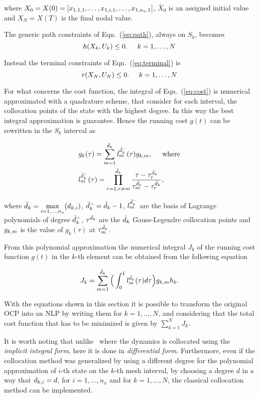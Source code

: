 where $X_0 = X(0) = [x_{1,1,1}, \dots, x_{1,i,1}, \dots, x_{1,n_{x},1}]$, $\bar{X}_{0}$ is an assigned initial value and $X_{N} = X(T)$ is the final nodal value.
 
 
The generic path constraints of Eqn.~(\ref{eq:path}), always on $S_k$, becomes
\begin{equation}\label{eq:nlpath}
h(X_k, U_k) \leq 0. \hspace{5mm} k = 1, \dots, N
\end{equation}

Instead the terminal constraints of Eqn.~(\ref{eq:terminal}) is
\begin{equation}\label{eq:npterminal}
	r(X_N, U_N) \leq 0. \hspace{5mm} k = 1, \dots, N
\end{equation}

For what concerns the cost function, the integral of Eqn.~(\ref{eq:cost}) is numerical approximated with a quadrature scheme, that consider for each interval, the collocation points of the state with the highest degree. In this way the best integral approximation is guarantee. Hence the running cost $g(t)$ can be rewritten in the $S_k$ interval as

\begin{subequations}
	\begin{align}
	& g_k(\tau) = \sum_{m=1}^{\bar{d}_k} l_{m}^{\bar{d}_{k}^{-}}(\tau)g_{k,m}, \hspace{5mm} \text{where} \label{eq:nlpcost}\\
	&  l_{m}^{\bar{d}_{k}^{-}} (\tau) = \prod_{r=1, r\neq m}^{\bar{d}_k} \dfrac{\tau - \tau^{\bar{d}_{k}}_{r}}{\tau^{\bar{d}_{k}}_{m} - \tau^{\bar{d}_{k}}_{r}}, \label{eq:nlplm}
	\end{align}
\end{subequations}

where $\bar{d}_k = \max\limits_{i= 1, \dots, n_x}(d_{k,i})$, $\bar{d}_k^{-} = \bar{d}_k -1$, $l_{m}^{\bar{d}_{k}^{-}}$ are the basis of Lagrange polynomials of degree $\bar{d}_k^{-}$, $\tau^{\bar{d}_{k}}$ are the $\bar{d}_k$ Gauss-Legendre collocation points and $g_{k,m}$ is the value of $g_k (\tau)$ at $\tau^{\bar{d}_{k}}_{m}$.

From this polynomial approximation the numerical integral $J_k$ of the running cost function $g(t)$ in the $k$-th element can be obtained from the following equation

\begin{equation}\label{eq:nlpcostk}
	J_k = \sum_{m=1}^{\bar{d}_k}\Big(\int_{0}^{1}l_{m}^{\bar{d}_{k}}(\tau)d\tau\Big)g_{k,m} h_{k}.
\end{equation}

With the equations shown in this section it is possible to transform the original OCP into an NLP by writing them for $k = 1, \dots, N$, and considering that the total cost function that has to be minimized is given by $\sum_{k=1}^{N}J_k$.

It is worth noting that unlike~\cite{Patterson:OCAM:2015} where the dynamics is collocated using the \emph{implicit integral form}, here it is done in \emph{differential form}.
Furthermore, even if the collocation method was generalized by using a different degree for the polynomial approximation of $i$-th state on the $k$-th mesh interval, by choosing a degree $d$ in a way that $d_{k,i} = d$, for $i = 1, \dots, n_x$ and for $k = 1, \dots, N$, the classical collocation method can be implemented.
